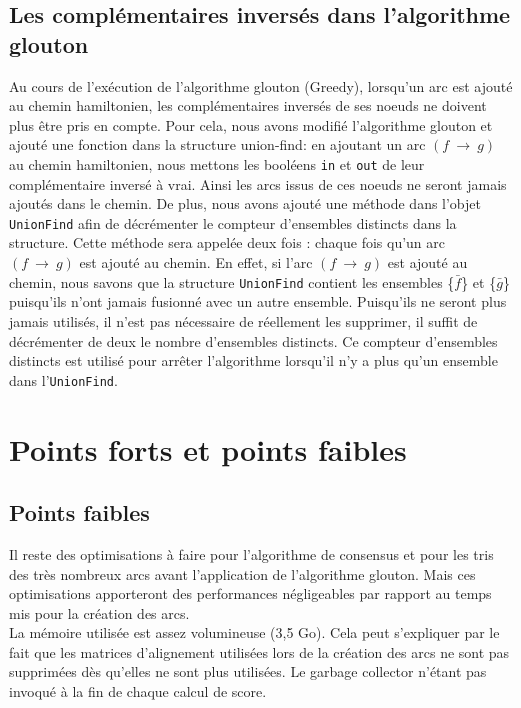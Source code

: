 \documentclass[a4paper, 12pt, titlepage]{article}
\newcommand{\arc}[2]{$(#1~\rightarrow~#2)$}
\begin{document}
\subsection{Les complémentaires inversés dans l'algorithme glouton}%
Au cours de l'exécution de l'algorithme glouton (Greedy), lorsqu'un arc est ajouté au chemin hamiltonien, les complémentaires inversés de ses noeuds ne doivent plus être pris en compte.
Pour cela, nous avons modifié l'algorithme glouton et ajouté une fonction dans la structure union-find:
en ajoutant un arc \arc{f}{g} au chemin hamiltonien, nous mettons les booléens \texttt{in} et \texttt{out} de leur complémentaire inversé à vrai.
Ainsi les arcs issus de ces noeuds ne seront jamais ajoutés dans le chemin.
De plus, nous avons ajouté une méthode dans l'objet \texttt{UnionFind} afin de décrémenter le compteur d'ensembles distincts dans la structure.
Cette méthode sera appelée deux fois : chaque fois qu'un arc \arc{f}{g} est ajouté au chemin.
En effet, si l'arc \arc{f}{g} est ajouté au chemin, nous savons que la structure \texttt{UnionFind} contient les ensembles \{$\bar{f}$\} et \{$\bar{g}$\} puisqu'ils n'ont jamais fusionné avec un autre ensemble.
Puisqu'ils ne seront plus jamais utilisés, il n'est pas nécessaire de
réellement les supprimer, il suffit de décrémenter de deux le nombre d'ensembles distincts.
Ce compteur d'ensembles distincts est utilisé pour arrêter l'algorithme
lorsqu'il n'y a plus qu'un ensemble dans l'\texttt{UnionFind}.





\section{Points forts et points faibles}
\subsection*{Points faibles}
Il reste des optimisations à faire pour l'algorithme de consensus et pour les tris des très nombreux arcs avant l'application de l'algorithme glouton.
Mais ces optimisations apporteront des performances négligeables par rapport au temps mis pour la création des arcs.\\

La mémoire utilisée est assez volumineuse (3,5 Go).
Cela peut s'expliquer par le fait que les matrices d'alignement utilisées lors de la création des arcs ne sont pas supprimées dès qu'elles ne sont plus utilisées.
Le garbage collector n'étant pas invoqué à la fin de chaque calcul de score.\\
\end{document}
